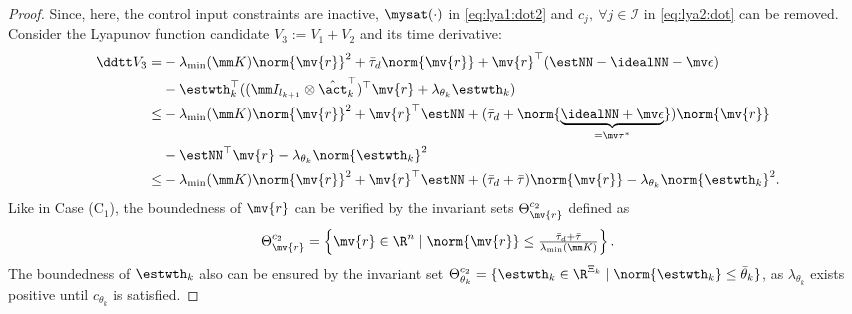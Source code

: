 \documentclass[lettersize,journal]{IEEEtran}
\newcommand*{\fe}{\mv{r}}
\begin{document}
\begin{proof}
Since, here, the control input constraints are inactive, $\mysat(\cdot)$ in \eqref{eq:lya1:dot2} and $c_j,\ \forall j\in\mathcal{I}$ in \eqref{eq:lya2:dot} can be removed.
Consider the Lyapunov function candidate $V_3:=V_1+V_2$ and its time derivative:
\begin{equation}
    \begin{aligned}
        \ddtt V_3
        =&
        -\lambda_{\text{min}}(\mm K)\norm{\fe}^2
        +\bar\tau_d\norm{\fe}
        +\fe^\top (\estNN - \idealNN - \mv\epsilon)
        \\
        &
        -\estwth_k^\top (
            (\mm I_{l_{k+1}}\otimes \hat\act_k^\top)^\top
            \fe
            +
            \lambda_{\theta_k}\estwth_k
        )
        \\
        \le&
        -\lambda_{\text{min}}(\mm K)\norm{\fe}^2
        +\fe^\top \estNN
        +(
            \bar\tau_d+\norm{
                \underbrace{
                    \idealNN+\mv\epsilon
                }_{=\mv\tau^*}
            }
        )
        \norm{\fe}
        \\
        &
        -\estNN^\top\fe 
        -\lambda_{\theta_k}\norm{\estwth_k}^2
        \\
        \le&
        -\lambda_{\text{min}}(\mm K)\norm{\fe}^2
        +\fe^\top \estNN
        +(\bar\tau_d+\bar\tau)
        \norm{\fe}
        -\lambda_{\theta_k}\norm{\estwth_k}^2
        .
    \end{aligned}
    \label{eq:lya3:dot}
\end{equation}
Like in Case (C$_1$), the boundedness of $\fe$ can be verified by the invariant sets $\Theta_{\fe}^{c_2}$ defined as
\begin{equation}
    \Theta_{\fe}^{c_2}
    =
    \left\{ 
        \fe \in \R^n 
        \mid 
        \norm{\fe} 
        \le 
        \tfrac{
            \bar\tau_d+\bar\tau
        }{
            \lambda_{\text{min}}(\mm K)
        }
    \right\}
    .
\end{equation}
The boundedness of $\estwth_k$ also can be ensured by the invariant set $\Theta_{\theta_k}^{c_2}=\{ \estwth_k \in \R^{\Xi_{k}} \mid \norm{\estwth_k} \le \bar\theta_k \}$, as $\lambda_{\theta_k}$ exists positive until $c_{\theta_k}$ is satisfied.

\hfill 


\end{proof}
\end{document}

